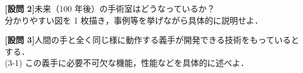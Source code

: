 \documentclass{jsarticle}
\begin{document}
\newpage
\textbf{{[設問 2]}}\hspace*{1zw}未来（100 年後）の手術室はどうなっているか？\\
\hspace*{5.7zw}分かりやすい図を 1 枚描き，事例等を挙げながら具体的に説明せよ．\\



\newpage

\vspace*{-10zh}

\textbf{{[設問 3]}}\hspace*{1zw}人間の手と全く同じ様に動作する義手が開発できる技術をもっているとする．\\
\hspace*{5.7zw}(3-1) この義手に必要不可欠な機能，性能などを具体的に述べよ．
\end{document}
